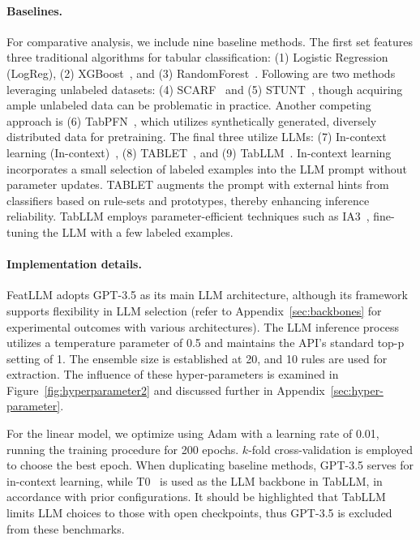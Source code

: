 \vspace*{-0.12in}
\paragraph{Baselines.}
For comparative analysis, we include nine baseline methods. The first set features three traditional algorithms for tabular classification: (1) Logistic Regression (LogReg), (2) XGBoost~\cite{chen2016xgboost}, and (3) RandomForest~\cite{ho1995random}. Following are two methods leveraging unlabeled datasets: (4) SCARF~\cite{bahri2022scarf} and (5) STUNT~\cite{nam2023stunt}, though acquiring ample unlabeled data can be problematic in practice. Another competing approach is (6) TabPFN~\cite{hollmann2022tabpfn}, which utilizes synthetically generated, diversely distributed data for pretraining. The final three utilize LLMs: (7) In-context learning (In-context)~\cite{wei2022emergent}, (8) TABLET~\cite{slack2023tablet}, and (9) TabLLM~\cite{hegselmann2023tabllm}. In-context learning incorporates a small selection of labeled examples into the LLM prompt without parameter updates. TABLET augments the prompt with external hints from classifiers based on rule-sets and prototypes, thereby enhancing inference reliability. TabLLM employs parameter-efficient techniques such as IA3~\cite{liu2022few}, fine-tuning the LLM with a few labeled examples.

\vspace*{-0.12in}
\paragraph{Implementation details.}
\textsf{FeatLLM} adopts GPT-3.5 as its main LLM architecture, although its framework supports flexibility in LLM selection (refer to Appendix~\ref{sec:backbones} for experimental outcomes with various architectures). The LLM inference process utilizes a temperature parameter of 0.5 and maintains the API's standard top-p setting of 1. The ensemble size is established at 20, and 10 rules are used for extraction. The influence of these hyper-parameters is examined in Figure~\ref{fig:hyperparameter2} and discussed further in Appendix~\ref{sec:hyper-parameter}. 

For the linear model, we optimize using Adam with a learning rate of 0.01, running the training procedure for 200 epochs. $k$-fold cross-validation is employed to choose the best epoch. When duplicating baseline methods, GPT-3.5 serves for in-context learning, while T0~\cite{sanh2022multitask} is used as the LLM backbone in TabLLM, in accordance with prior configurations. It should be highlighted that TabLLM limits LLM choices to those with open checkpoints, thus GPT-3.5 is excluded from these benchmarks. 


